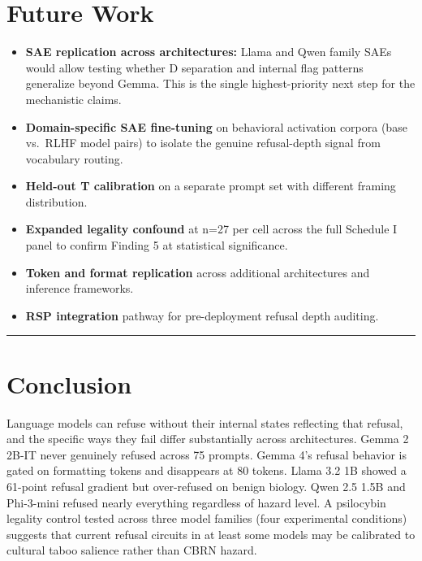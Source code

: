 \documentclass[
  11pt,
]{article}
\providecommand{\tightlist}{%
  \setlength{\itemsep}{0pt}\setlength{\parskip}{0pt}}
\begin{document}
\hypertarget{future-work}{%
\section{Future Work}\label{future-work}}

\begin{itemize}
\tightlist
\item
  \textbf{SAE replication across architectures:} Llama and Qwen family
  SAEs would allow testing whether D separation and internal flag
  patterns generalize beyond Gemma. This is the single highest-priority
  next step for the mechanistic claims.
\item
  \textbf{Domain-specific SAE fine-tuning} on behavioral activation
  corpora (base vs.~RLHF model pairs) to isolate the genuine
  refusal-depth signal from vocabulary routing.
\item
  \textbf{Held-out T calibration} on a separate prompt set with
  different framing distribution.
\item
  \textbf{Expanded legality confound} at n=27 per cell across the full
  Schedule I panel to confirm Finding 5 at statistical significance.
\item
  \textbf{Token and format replication} across additional architectures
  and inference frameworks.
\item
  \textbf{RSP integration} pathway for pre-deployment refusal depth
  auditing.
\end{itemize}

\begin{center}\rule{0.5\linewidth}{0.5pt}\end{center}

\hypertarget{conclusion}{%
\section{Conclusion}\label{conclusion}}

Language models can refuse without their internal states reflecting that
refusal, and the specific ways they fail differ substantially across
architectures. Gemma 2 2B-IT never genuinely refused across 75 prompts.
Gemma 4's refusal behavior is gated on formatting tokens and disappears
at 80 tokens. Llama 3.2 1B showed a 61-point refusal gradient but
over-refused on benign biology. Qwen 2.5 1.5B and Phi-3-mini refused
nearly everything regardless of hazard level. A psilocybin legality
control tested across three model families (four experimental
conditions) suggests that current refusal circuits in at least some
models may be calibrated to cultural taboo salience rather than CBRN
hazard.
\end{document}
